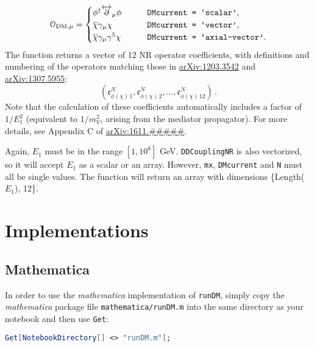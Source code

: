 \documentclass[notitlepage,12pt]{article}
\newcommand{\ourpaper}{\href{http://arxiv.org/abs/1611.#####}{arXiv:1611.#####}\xspace}
\begin{document}
\begin{equation}
\mathcal{O}_{\mathrm{DM}, \mu} = 
\begin{cases}
\phi^\dagger \overleftrightarrow{\partial}_\mu \phi & \qquad \text{\texttt{DMcurrent = `scalar'},}\\
\overline{\chi} \gamma_\mu \chi & \qquad \text{\texttt{DMcurrent = `vector'},}\\
\overline{\chi} \gamma_\mu \gamma^5 \chi & \qquad \text{\texttt{DMcurrent = `axial-vector'}.}\\
\end{cases}
\end{equation}
The function returns a vector of 12 NR operator coefficients, with definitions and numbering of the operators matching those in \href{http://arxiv.org/abs/1203.3542}{arXiv:1203.3542} and \href{http://arxiv.org/abs/1307.5955}{arXiv:1307.5955}:
\begin{equation}
\left(\mathfrak{c}_{\phi(\chi) \, 1}^{N}, \mathfrak{c}_{\phi(\chi) \, 2}^{N}, ..., \mathfrak{c}_{\phi(\chi) \, 12}^{N}\right) \,.
\end{equation}
Note that the calculation of these coefficients automatically includes a factor of $1/E_1^2$ (equivalent to $1/m_V^2$, arising from the mediator propagator). For more details, see Appendix C of \ourpaper.

Again, $E_1$ must be in the range $[1, 10^8]$ GeV. \texttt{DDCouplingNR} is also vectorized, so it will accept $E_1$ as a scalar or an array.  However, \texttt{mx}, \texttt{DMcurrent} and \texttt{N} must all be single values. The function will return an array with dimensions \{Length($E_1$), 12\}.
\section{Implementations}
\label{sec:implementations}

\subsection{Mathematica}

In order to use the \textit{mathematica} implementation of \texttt{runDM}, simply copy the \textit{mathematica} package file \texttt{mathematica/runDM.m} into the same directory as your notebook and then use \texttt{Get}:

\begin{lstlisting}[language=mathematica]
Get[NotebookDirectory[] <> "runDM.m"];
\end{lstlisting}
\end{document}
